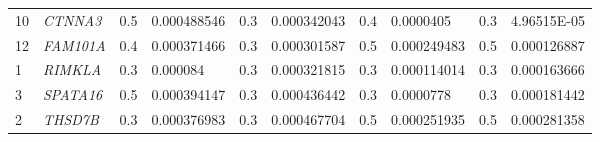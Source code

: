 \begin{refsection}
\begin{otherlanguage}{english}
\begin{scriptsize}
\begin{longtable}{llllllllll}
10 & \cellcolor[HTML]{009901}\textit{CTNNA3} & 0.5 & 0.000488546 & 0.3 & 0.000342043 & 0.4 & 0.0000405 & 0.3 & 4.96515E-05 \\
12 & \cellcolor[HTML]{009901}\textit{FAM101A} & 0.4 & 0.000371466 & 0.3 & 0.000301587 & 0.5 & 0.000249483 & 0.5 & 0.000126887 \\
1 & \cellcolor[HTML]{009901}\textit{RIMKLA} & 0.3 & 0.000084 & 0.3 & 0.000321815 & 0.3 & 0.000114014 & 0.3 & 0.000163666 \\
3 & \cellcolor[HTML]{009901}\textit{SPATA16} & 0.5 & 0.000394147 & 0.3 & 0.000436442 & 0.3 & 0.0000778 & 0.3 & 0.000181442 \\
2 & \cellcolor[HTML]{009901}\textit{THSD7B} & 0.3 & 0.000376983 & 0.3 & 0.000467704 & 0.5 & 0.000251935 & 0.5 & 0.000281358 \\ \bottomrule
\end{longtable}
\end{scriptsize}

\bigskip
\bigskip


\end{otherlanguage}
\end{refsection}
